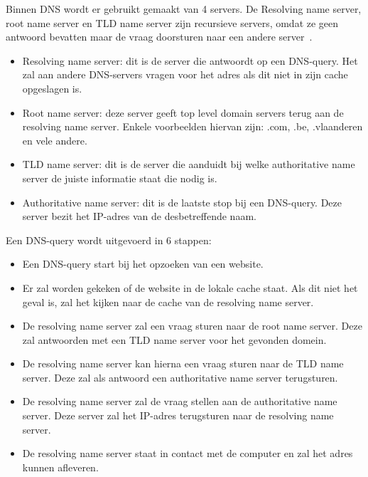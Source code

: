 Binnen DNS wordt er gebruikt gemaakt van 4 servers. De Resolving name server, root name server en TLD name server zijn recursieve servers, omdat ze geen antwoord bevatten maar de vraag doorsturen naar een andere server~\autocite{Petters2021}.
\begin{itemize}
    \item Resolving name server: dit is de server die antwoordt op een DNS-query. Het zal aan andere DNS-servers vragen voor het adres als dit niet in zijn cache opgeslagen is.
    \item Root name server: deze server geeft top level domain servers terug aan de resolving name server. Enkele voorbeelden hiervan zijn: .com, .be, .vlaanderen en vele andere.
    \item TLD name server: dit is de server die aanduidt bij welke authoritative name server de juiste informatie staat die nodig is.
    \item Authoritative name server: dit is de laatste stop bij een DNS-query. Deze server bezit het IP-adres van de desbetreffende naam.
\end{itemize} 


Een DNS-query wordt uitgevoerd in 6 stappen:
\begin{itemize}
    \item Een DNS-query start bij het opzoeken van een website. 
    \item Er zal worden gekeken of de website in de lokale cache staat. Als dit niet het geval is, zal het kijken naar de cache van de resolving name server.
    \item De resolving name server zal een vraag sturen naar de root name server. Deze zal antwoorden met een TLD name server voor het gevonden domein.
    \item De resolving name server kan hierna een vraag sturen naar de TLD name server. Deze zal als antwoord een authoritative name server terugsturen.
    \item De resolving name server zal de vraag stellen aan de authoritative name server. Deze server zal het IP-adres terugsturen naar de resolving name server.
    \item De resolving name server staat in contact met de computer en zal het adres kunnen afleveren. 
    \end{itemize}


